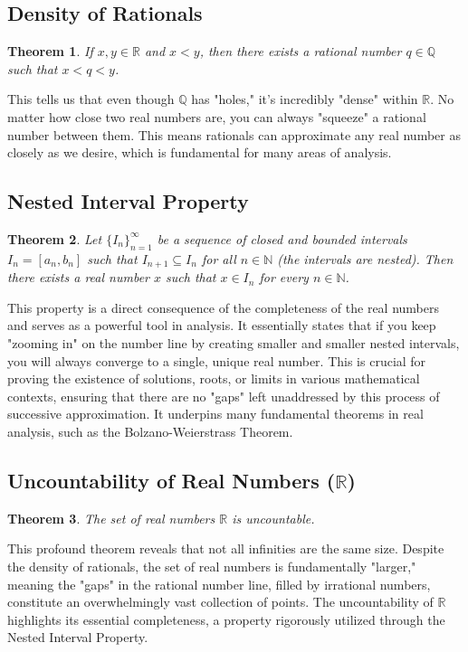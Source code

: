 \documentclass[12pt]{article}
\newtheorem{theorem}{Theorem}[section]     %
\begin{document}
\subsection{Density of Rationals}

\begin{theorem}
If $x, y \in \mathbb{R}$ and $x < y$, then there exists a rational number $q \in \mathbb{Q}$ such that $x < q < y$.
\end{theorem}
This tells us that even though $\mathbb{Q}$ has "holes," it's incredibly "dense" within $\mathbb{R}$. No matter how close two real numbers are, you can always "squeeze" a rational number between them. This means rationals can approximate any real number as closely as we desire, which is fundamental for many areas of analysis.

\subsection{Nested Interval Property}
\begin{theorem}
Let $\{I_n\}_{n=1}^{\infty}$ be a sequence of closed and bounded intervals $I_n = [a_n, b_n]$ such that $I_{n+1} \subseteq I_n$ for all $n \in \mathbb{N}$ (the intervals are nested). Then there exists a real number $x$ such that $x \in I_n$ for every $n \in \mathbb{N}$.
\end{theorem}
This property is a direct consequence of the completeness of the real numbers and serves as a powerful tool in analysis. It essentially states that if you keep "zooming in" on the number line by creating smaller and smaller nested intervals, you will always converge to a single, unique real number. This is crucial for proving the existence of solutions, roots, or limits in various mathematical contexts, ensuring that there are no "gaps" left unaddressed by this process of successive approximation. It underpins many fundamental theorems in real analysis, such as the Bolzano-Weierstrass Theorem.

\subsection{Uncountability of Real Numbers ($\mathbb{R}$)}
\begin{theorem}
The set of real numbers $\mathbb{R}$ is uncountable.
\end{theorem}

This profound theorem reveals that not all infinities are the same size. Despite the density of rationals, the set of real numbers is fundamentally "larger," meaning the "gaps" in the rational number line, filled by irrational numbers, constitute an overwhelmingly vast collection of points. The uncountability of $\mathbb{R}$ highlights its essential completeness, a property rigorously utilized through the Nested Interval Property.
\end{document}
